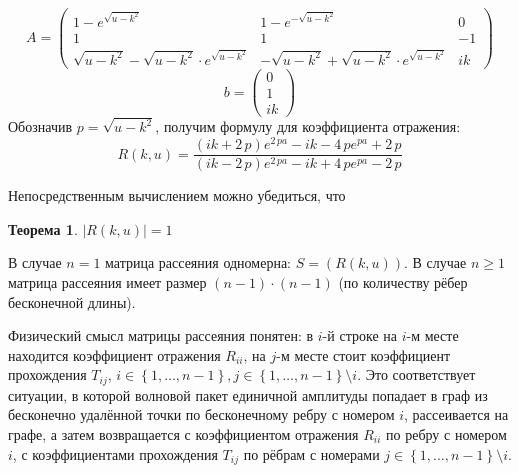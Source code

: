 \documentclass[a4 paper, 12 pt]{extarticle}
\newtheorem{theorem}{Теорема}[section]
\begin{document}
   \[ A = \left(\begin{smallmatrix}
   1-e^{\sqrt{u-k^2}} & 1-e^{-\sqrt{u-k^2}} & 0 \\
   1 & 1 & -1 \\
   \sqrt{u-k^2}-\sqrt{u-k^2} \cdot e^{\sqrt{u-k^2}} & -\sqrt{u-k^2}+\sqrt{u-k^2} \cdot e^{\sqrt{u-k^2}} & ik
   \end{smallmatrix}\right)\]
   \[b = \left(\begin{smallmatrix}
   0 \\
   1 \\
   ik
   \end{smallmatrix}\right)
   \]
   Обозначив $p=\sqrt{u-k^2}$, получим формулу для коэффициента отражения:
   \begin{equation}
   R\left(k,u\right) = {\frac { \left( ik+2\,p \right) {e}^{2\,pa}-ik-4\,p{e}^{pa}+2\,p}{ \left( ik-2\,p \right) {e}^{2\,pa}-ik+4\,p{e}^{pa}-2\,p}}
   \end{equation}
     
   Непосредственным вычислением можно убедиться, что 
   \begin{theorem}
   	$\left|R\left(k,u\right)\right| = 1$
   \end{theorem}
   
   В случае $n=1$ матрица рассеяния одномерна: $S = \left(R\left(k,u\right)\right)$. 
   В случае $n \geqslant 1$ матрица рассеяния имеет размер $(n-1) \cdot (n-1)$ (по количеству рёбер бесконечной длины).
   
   Физический смысл матрицы рассеяния понятен: в $i$-й строке на $i$-м месте находится коэффициент отражения $R_{ii}$, на $j$-м месте стоит коэффициент прохождения $T_{ij}$, $i \in \left\{1,\ldots,n-1\right\}, j \in \left\{1,\ldots,n-1\right\}\setminus i $.  Это соответствует ситуации, в которой волновой пакет единичной амплитуды попадает в граф из бесконечно удалённой точки по бесконечному ребру с номером $i$, рассеивается на графе, а затем возвращается с коэффициентом отражения $R_{ii}$ по ребру с номером $i$, с коэффициентами прохождения $T_{ij}$ по рёбрам с номерами $j \in \left\{1,\ldots,n-1\right\}\setminus i $.
   
\end{document}
